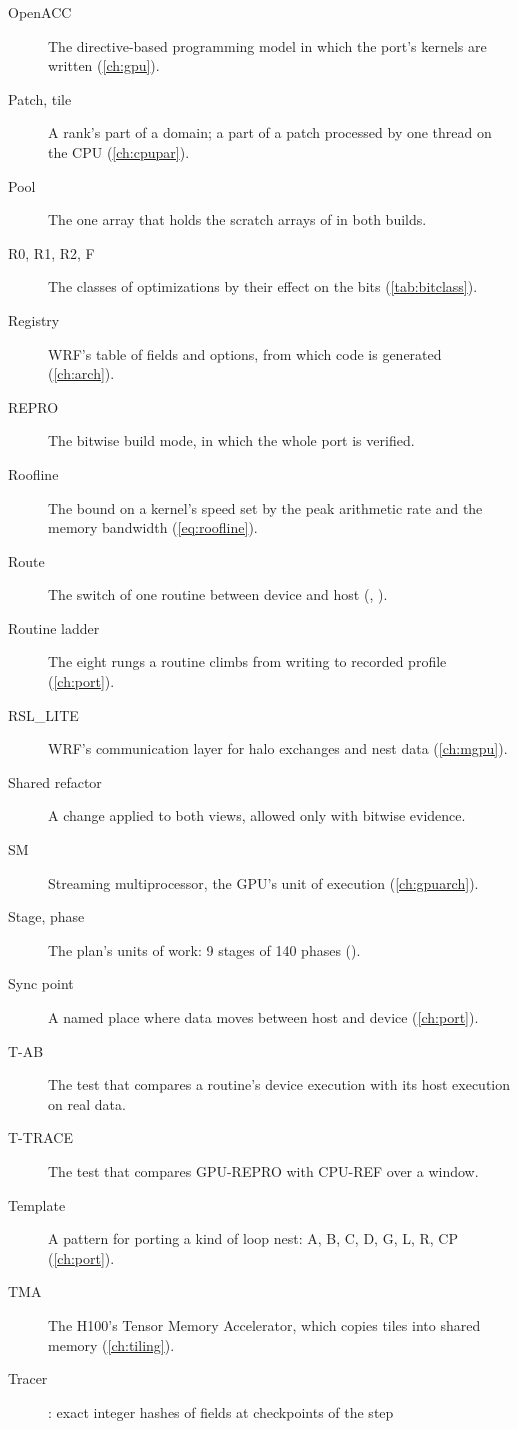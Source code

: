 \begin{description}
  \item[OpenACC] The directive-based programming model in which the port's kernels are written (\cref{ch:gpu}).
  \item[Patch, tile] A rank's part of a domain; a part of a patch processed by one thread on the CPU
    (\cref{ch:cpupar}).
  \item[Pool] The one array that holds the scratch arrays of  in both builds.
  \item[R0, R1, R2, F] The classes of optimizations by their effect on the bits (\cref{tab:bitclass}).
  \item[Registry] WRF's table of fields and options, from which code is generated (\cref{ch:arch}).
  \item[REPRO] The bitwise build mode, in which the whole port is verified.
  \item[Roofline] The bound on a kernel's speed set by the peak arithmetic rate and the memory bandwidth
    (\cref{eq:roofline}).
  \item[Route] The switch of one routine between device and host (, ).
  \item[Routine ladder] The eight rungs a routine climbs from writing to recorded profile (\cref{ch:port}).
  \item[RSL\_LITE] WRF's communication layer for halo exchanges and nest data (\cref{ch:mgpu}).
  \item[Shared refactor] A change applied to both views, allowed only with bitwise evidence.
  \item[SM] Streaming multiprocessor, the GPU's unit of execution (\cref{ch:gpuarch}).
  \item[Stage, phase] The plan's units of work: 9 stages of 140 phases ().
  \item[Sync point] A named place where data moves between host and device (\cref{ch:port}).
  \item[T-AB] The test that compares a routine's device execution with its host execution on real data.
  \item[T-TRACE] The test that compares GPU-REPRO with CPU-REF over a window.
  \item[Template] A pattern for porting a kind of loop nest: A, B, C, D, G, L, R, CP (\cref{ch:port}).
  \item[TMA] The H100's Tensor Memory Accelerator, which copies tiles into shared memory (\cref{ch:tiling}).
  \item[Tracer] : exact integer hashes of fields at checkpoints of the step

\end{description}
